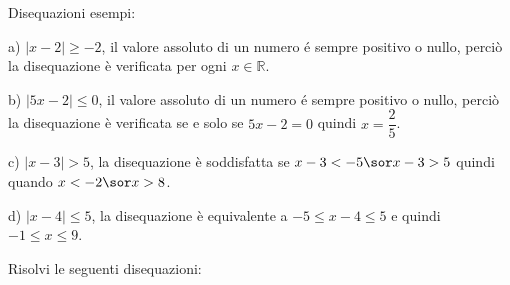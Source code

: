 \begin{esercizio}\label{ese:03.1}
Disequazioni esempi:
\begin{enumeratea}
        \item[a)] \(|x-2|\geq -2\), il valore assoluto di un numero é 
sempre 
positivo o nullo, perciò la disequazione è verificata per ogni \(x\in 
\mathbb{R}\).

        \item[b)] \(|5x-2|\leq 0\), il valore assoluto di un numero é 
sempre 
positivo o nullo, perciò la disequazione è verificata se e solo se 
\(5x-2=0\) 
quindi \(x=\dfrac{2}{5}\).
        \item[c)] \(|x-3|>5\), la disequazione è soddisfatta se \(x-3<-5 
\sor 
x-3>5\) quindi quando \(x<-2 \sor x>8\).
        \item[d)] \(|x-4|\leq 5\), la disequazione è equivalente a \(-5\leq 
x-4 
\leq 5\) e quindi \(-1\leq x \leq 9\).
\end{enumeratea}

\noindent Risolvi le seguenti disequazioni:


\end{esercizio}
